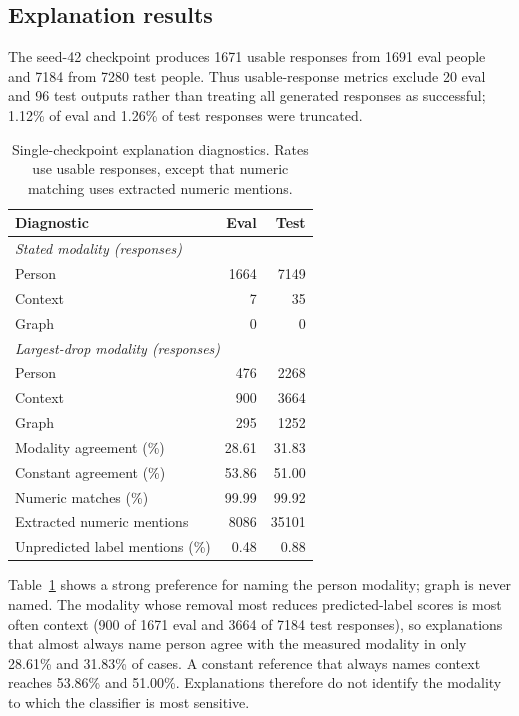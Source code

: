 \documentclass[conference]{IEEEtran}
\newcommand{\tablegap}{\setlength{\tabcolsep}{4pt}}
\begin{document}
\subsection{Explanation results}\label{sec:explanations}
The seed-42 checkpoint produces 1671 usable responses from 1691 eval people and 7184 from 7280 test people. Thus usable-response metrics exclude 20 eval and 96 test outputs rather than treating all generated responses as successful; 1.12\% of eval and 1.26\% of test responses were truncated.

\begin{table}[t]
\centering
\caption{Single-checkpoint explanation diagnostics. Rates use usable responses, except that numeric matching uses extracted numeric mentions.}
\label{tab:explanations}
\small
\tablegap
\begin{tabular}{lrr}
\toprule
Diagnostic & Eval & Test \\
\midrule
\multicolumn{3}{l}{\emph{Stated modality (responses)}} \\
\quad Person & 1664 & 7149 \\
\quad Context & 7 & 35 \\
\quad Graph & 0 & 0 \\
\multicolumn{3}{l}{\emph{Largest-drop modality (responses)}} \\
\quad Person & 476 & 2268 \\
\quad Context & 900 & 3664 \\
\quad Graph & 295 & 1252 \\
\midrule
Modality agreement (\%) & 28.61 & 31.83 \\
Constant agreement (\%) & 53.86 & 51.00 \\
Numeric matches (\%) & 99.99 & 99.92 \\
Extracted numeric mentions & 8086 & 35101 \\
Unpredicted label mentions (\%) & 0.48 & 0.88 \\
\bottomrule
\end{tabular}
\end{table}

Table~\ref{tab:explanations} shows a strong preference for naming the person modality; graph is never named. The modality whose removal most reduces predicted-label scores is most often context (900 of 1671 eval and 3664 of 7184 test responses), so explanations that almost always name person agree with the measured modality in only 28.61\% and 31.83\% of cases. A constant reference that always names context reaches 53.86\% and 51.00\%. Explanations therefore do not identify the modality to which the classifier is most sensitive.
\end{document}
